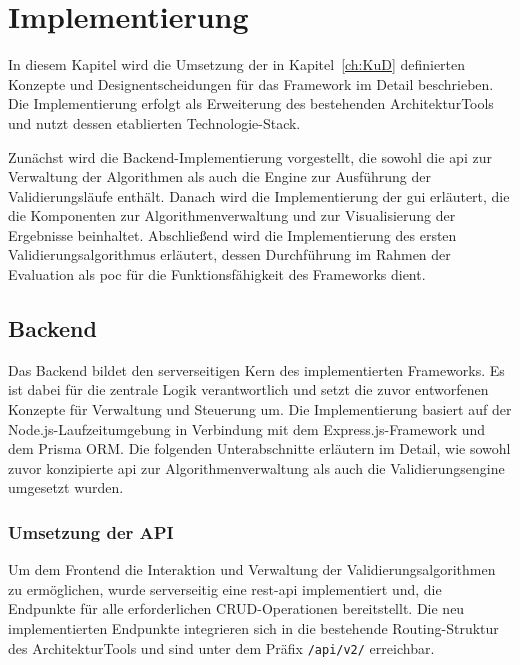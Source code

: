 

\chapter{Implementierung}
\label{ch:imp}

In diesem Kapitel wird die Umsetzung der in Kapitel~\ref{ch:KuD} definierten Konzepte und Designentscheidungen für das Framework im Detail beschrieben. Die Implementierung erfolgt als Erweiterung des bestehenden ArchitekturTools und nutzt dessen etablierten Technologie-Stack.

Zunächst wird die Backend-Implementierung vorgestellt, die sowohl die \gls{api} zur Verwaltung der Algorithmen als auch die Engine zur Ausführung der Validierungsläufe enthält. Danach wird die Implementierung der \gls{gui} erläutert, die die Komponenten zur Algorithmenverwaltung und zur Visualisierung der Ergebnisse beinhaltet. Abschließend wird die Implementierung des ersten Validierungsalgorithmus erläutert, dessen Durchführung im Rahmen der Evaluation als \gls{poc} für die Funktionsfähigkeit des Frameworks dient.

\section{Backend}
\label{sec:backendimp}

Das Backend bildet den serverseitigen Kern des implementierten Frameworks. Es ist dabei für die zentrale Logik verantwortlich und setzt die zuvor entworfenen Konzepte für  Verwaltung und Steuerung um. Die Implementierung basiert auf der Node.js-Laufzeitumgebung in Verbindung mit dem Express.js-Framework und dem Prisma ORM. Die folgenden Unterabschnitte erläutern im Detail, wie sowohl zuvor konzipierte \gls{api} zur Algorithmenverwaltung als auch die Validierungsengine umgesetzt wurden.

\subsection{Umsetzung der API}
\label{subsec:api}

Um dem Frontend die Interaktion und Verwaltung der Validierungsalgorithmen zu ermöglichen, wurde serverseitig eine \gls{rest}-\gls{api} implementiert und, die Endpunkte für alle erforderlichen CRUD-Operationen bereitstellt. Die neu implementierten Endpunkte integrieren sich in die bestehende Routing-Struktur des ArchitekturTools und sind unter dem Präfix \texttt{/api/v2/} erreichbar.

